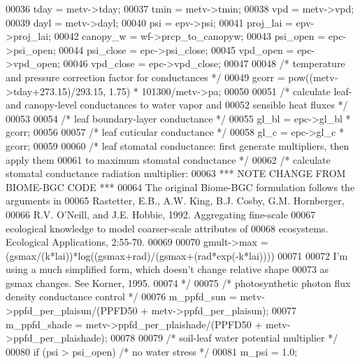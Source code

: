 \begin{DoxyCode}
00036     tday =      metv->tday;
00037     tmin =      metv->tmin;
00038     vpd =       metv->vpd;
00039     dayl =      metv->dayl;
00040     psi =       epv->psi;
00041     proj\_lai =  epv->proj\_lai;
00042     canopy\_w =  wf->prcp\_to\_canopyw;
00043     psi\_open =  epc->psi\_open;
00044     psi\_close = epc->psi\_close;
00045     vpd\_open =  epc->vpd\_open;
00046     vpd\_close = epc->vpd\_close;
00047 
00048     \textcolor{comment}{/* temperature and pressure correction factor for conductances */}
00049     gcorr = pow((metv->tday+273.15)/293.15, 1.75) * 101300/metv->pa;
00050     
00051     \textcolor{comment}{/* calculate leaf- and canopy-level conductances to water vapor and}
00052 \textcolor{comment}{    sensible heat fluxes */}
00053     
00054     \textcolor{comment}{/* leaf boundary-layer conductance */}
00055     gl\_bl = epc->gl\_bl * gcorr;
00056     
00057     \textcolor{comment}{/* leaf cuticular conductance */}
00058     gl\_c = epc->gl\_c * gcorr;
00059     
00060     \textcolor{comment}{/* leaf stomatal conductance: first generate multipliers, then apply them}
00061 \textcolor{comment}{    to maximum stomatal conductance */}
00062     \textcolor{comment}{/* calculate stomatal conductance radiation multiplier: }
00063 \textcolor{comment}{    *** NOTE CHANGE FROM BIOME-BGC CODE ***}
00064 \textcolor{comment}{    The original Biome-BGC formulation follows the arguments in }
00065 \textcolor{comment}{    Rastetter, E.B., A.W. King, B.J. Cosby, G.M. Hornberger, }
00066 \textcolor{comment}{       R.V. O'Neill, and J.E. Hobbie, 1992. Aggregating fine-scale }
00067 \textcolor{comment}{       ecological knowledge to model coarser-scale attributes of }
00068 \textcolor{comment}{       ecosystems. Ecological Applications, 2:55-70.}
00069 \textcolor{comment}{}
00070 \textcolor{comment}{    gmult->max = (gsmax/(k*lai))*log((gsmax+rad)/(gsmax+(rad*exp(-k*lai))))}
00071 \textcolor{comment}{}
00072 \textcolor{comment}{    I'm using a much simplified form, which doesn't change relative shape}
00073 \textcolor{comment}{    as gsmax changes. See Korner, 1995.}
00074 \textcolor{comment}{    */}
00075     \textcolor{comment}{/* photosynthetic photon flux density conductance control */}
00076     m\_ppfd\_sun = metv->ppfd\_per\_plaisun/(PPFD50 + metv->ppfd\_per\_plaisun);
00077     m\_ppfd\_shade = metv->ppfd\_per\_plaishade/(PPFD50 + metv->ppfd\_per\_plaishade);
00078 
00079     \textcolor{comment}{/* soil-leaf water potential multiplier */}
00080     \textcolor{keywordflow}{if} (psi > psi\_open)    \textcolor{comment}{/* no water stress */}
00081         m\_psi = 1.0;        

\end{DoxyCode}
